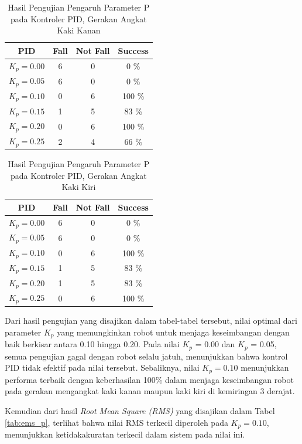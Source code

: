 \begin{enumerate}[label=\Alph*.]
        \begin{table}[h]
            \centering
            \caption{Hasil Pengujian Pengaruh Parameter P pada Kontroler PID, Gerakan Angkat Kaki Kanan}
            \begin{tabular}{|c|c|c|c|}
                \hline
                \textbf{PID} & \textbf{Fall} & \textbf{Not Fall} & \textbf{Success} \\
                \hline
                $K_p = 0.00$ & 6 & 0 & 0   \% \\
                $K_p = 0.05$ & 6 & 0 & 0   \% \\
                $K_p = 0.10$ & 0 & 6 & 100 \% \\
                $K_p = 0.15$ & 1 & 5 & 83  \% \\
                $K_p = 0.20$ & 0 & 6 & 100 \% \\
                $K_p = 0.25$ & 2 & 4 & 66  \% \\            
                \hline
            \end{tabular}
            \label{tab:pengujian_p_kanan}
        \end{table}

        \begin{table}[h]
            \centering
            \caption{Hasil Pengujian Pengaruh Parameter P pada Kontroler PID, Gerakan Angkat Kaki Kiri}
            \begin{tabular}{|c|c|c|c|}
                \hline
                \textbf{PID} & \textbf{Fall} & \textbf{Not Fall} & \textbf{Success} \\
                \hline
                $K_p = 0.00$ & 6 & 0 & 0   \% \\
                $K_p = 0.05$ & 6 & 0 & 0   \% \\
                $K_p = 0.10$ & 0 & 6 & 100  \% \\
                $K_p = 0.15$ & 1 & 5 & 83  \% \\
                $K_p = 0.20$ & 1 & 5 & 83  \% \\
                $K_p = 0.25$ & 0 & 6 & 100 \% \\            
                \hline
            \end{tabular}
            \label{tab:pengujian_p_kiri}
        \end{table}

        \hspace*{1em} Dari hasil pengujian yang disajikan dalam tabel-tabel tersebut, nilai optimal dari parameter \(K_p\) yang memungkinkan robot untuk menjaga keseimbangan dengan baik berkisar antara 0.10 hingga 0.20. Pada nilai \(K_p\) = 0.00 dan \(K_p\) = 0.05, semua pengujian gagal dengan robot selalu jatuh, menunjukkan bahwa kontrol PID tidak efektif pada nilai tersebut. Sebaliknya, nilai \(K_p = 0.10\) menunjukkan performa terbaik dengan keberhasilan 100\% dalam menjaga keseimbangan robot pada gerakan mengangkat kaki kanan maupun kaki kiri di kemiringan 3 derajat. 

        \hspace*{1em} Kemudian dari hasil \textit{Root Mean Square (RMS)} yang disajikan dalam Tabel \ref{tab:ems_p}, terlihat bahwa nilai RMS terkecil diperoleh pada \(K_p = 0.10\), menunjukkan ketidakakuratan terkecil dalam sistem pada nilai ini. 

\end{enumerate}